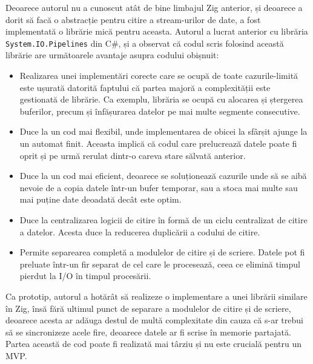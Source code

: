 \documentclass[a4paper,12pt]{report}
\begin{document}
Deoarece autorul nu a cunoscut atât de bine limbajul Zig anterior,
și deoarece a dorit să facă o abstracție pentru citire a stream-urilor de date,
a fost implementată o librărie mică pentru aceasta.
Autorul a lucrat anterior cu librăria \texttt{System.IO.Pipelines}\cite{system_io_pipelines} din C\#,
și a observat că codul scris folosind această librărie are următoarele avantaje 
asupra codului obișnuit:
\begin{itemize}
  \item 
    Realizarea unei implementări corecte care se ocupă de toate cazurile-limită 
    este ușurată datorită faptului că partea majoră a complexității este gestionată de librărie.
    Ca exemplu, librăria se ocupă cu alocarea și ștergerea buferilor,
    precum și înfășurarea datelor pe mai multe segmente consecutive.

  \item 
    Duce la un cod mai flexibil, unde implementarea de obicei la sfârșit ajunge 
    la un automat finit.
    Aceasta implică că codul care prelucrează datele poate
    fi oprit și pe urmă rerulat dintr-o careva stare sălvată anterior.

  \item
    Duce la un cod mai eficient, deoarece se soluționează cazurile unde să se aibă nevoie de
    a copia datele într-un bufer temporar, sau a stoca mai multe sau mai puține date deoadată
    decât este optim.

  \item
    Duce la centralizarea logicii de citire în formă de un ciclu centralizat de citire a datelor.
    Acesta duce la reducerea duplicării a codului de citire.

  \item
    Permite separearea completă a modulelor de citire și de scriere.
    Datele pot fi preluate într-un fir separat de cel care le procesează,
    ceea ce elimină timpul pierdut la \ac{I/O} în timpul procesării.
\end{itemize}
    
Ca prototip, autorul a hotărât să realizeze o implementare a unei librării similare în Zig,
însă fără ultimul punct de separare a modulelor de citire și de scriere,
deoarece acesta ar adăuga destul de multă complexitate din cauza că s-ar trebui
să se sincronizeze acele fire, deoarece datele ar fi scrise în memorie partajată.
Partea această de cod poate fi realizată mai târziu și nu este crucială pentru un \ac{MVP}.
\end{document}
